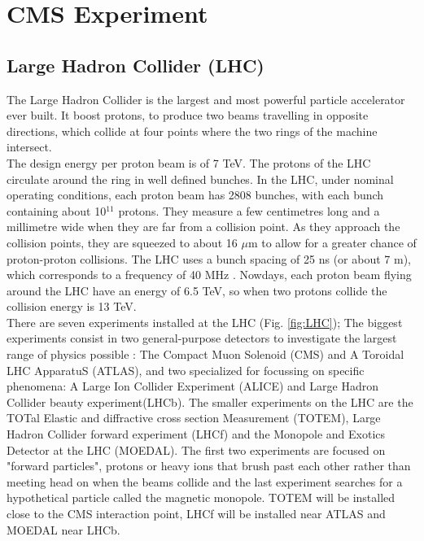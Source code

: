 \chapter{CMS Experiment}

\section{Large Hadron Collider (LHC)}

The Large Hadron Collider is the largest and most powerful particle accelerator ever built. It boost protons, to produce two beams travelling in opposite directions, which collide at four points where the two rings of the machine intersect.\\
\indent
The design energy per proton beam is of 7 TeV. The protons of the LHC circulate around the ring in well defined
bunches. In the LHC, under nominal operating conditions, each proton beam has 2808 bunches, with each bunch containing about 10$^{11}$ protons. They measure a few centimetres long and a millimetre wide when they are far from a collision point. As they approach the
collision points, they are squeezed to about 16 $\mu$m to allow for a greater chance of proton-proton collisions. The LHC uses a bunch spacing of 25 ns (or about 7 m), which  corresponds to a frequency of 40 MHz \cite{lhc}. Nowdays, each proton beam flying around the LHC have an energy of 6.5 TeV, so when two protons collide the collision energy is 13 TeV.\\
\indent
There are seven experiments installed at the LHC (Fig. \ref{fig:LHC}); The biggest experiments consist in two general-purpose detectors to investigate the largest range of physics possible : The Compact Muon Solenoid (CMS) and A Toroidal LHC ApparatuS (ATLAS), and two specialized for focussing on specific phenomena: A Large Ion Collider Experiment (ALICE) and Large Hadron Collider beauty experiment(LHCb).
The smaller experiments on the LHC are the TOTal Elastic and diffractive cross section Measurement (TOTEM), Large Hadron
Collider forward experiment (LHCf) and the Monopole and Exotics Detector at the LHC (MOEDAL). The first two experiments are  focused on "forward particles", protons or heavy ions that brush past each other rather than meeting head on when the beams collide and the last experiment searches for a hypothetical particle called the magnetic monopole.  
TOTEM will be installed close to the CMS interaction point, LHCf will be installed near ATLAS and MOEDAL near LHCb. 

